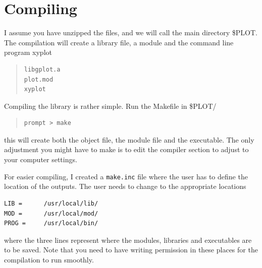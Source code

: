 \documentclass{article}
\begin{document}
\section{Compiling}
I assume you have unzipped the files, and we will call the main directory \$PLOT. The compilation will create a library file, a module and the command line program xyplot
\begin{quote}
\begin{verbatim}
libgplot.a
plot.mod
xyplot
\end{verbatim}
\end{quote}

\noindent Compiling the library is rather simple. Run the Makefile in \$PLOT/
\begin{quote}
\begin{verbatim}
prompt > make
\end{verbatim}
\end{quote}
this will create both the object file, the module file and the executable. The only adjustment you might have to make is to edit the compiler section to adjust to your computer settings.

For easier compiling, I created a {\tt make.inc} file where the user has to define the location of the outputs. The user needs to change to the appropriate locations
\begin{verbatim}
LIB =      /usr/local/lib/
MOD =      /usr/local/mod/
PROG =     /usr/local/bin/
\end{verbatim}
where the three lines represent where the modules, libraries and executables are to be saved. Note that you need to have writing permission in these places for the compilation to run smoothly. 
\end{document}
